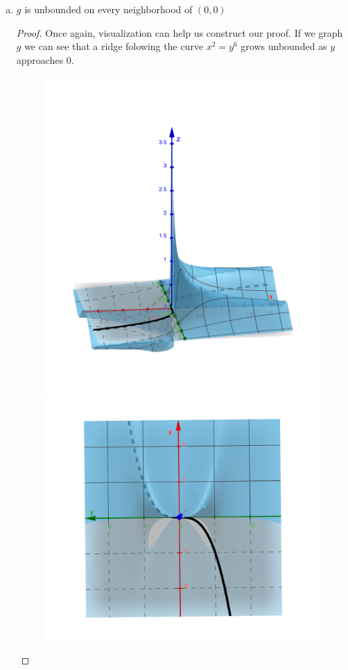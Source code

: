 \documentclass{article}
\begin{document}
\begin{enumerate}
\begin{enumerate}[a.]
\item \claim $g$ is unbounded on every neighborhood of $(0, 0)$
\begin{proof}
Once again, visualization can help us construct our proof. If we graph $g$
we can see that a ridge folowing the curve $x^2 = y^6$ grows unbounded as $y$
approaches 0.

\begin{figure}[h]
\includegraphics[scale=0.1]{figure-04-07-b1}
\includegraphics[scale=0.1]{figure-04-07-b2}
\centering
\end{figure}


\end{proof}
\end{enumerate}
\end{enumerate}
\end{document}
